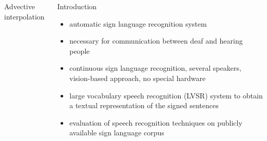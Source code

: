 \documentclass[final]{beamer}
\begin{document}
\begin{frame}{}
\begin{columns}[t]
\begin{column}{.3\linewidth}
\begin{block}{Advective interpolation}
      \end{block}
    \end{column}

  \begin{column}{.3\linewidth}
  \vfill
 
      \begin{block}{Introduction}
        \begin{itemize}
        \item automatic sign language recognition system                                    %
        \item \alert{necessary for communication} between deaf and
          hearing people
        \item \alert{continuous} sign language recognition,
          \alert{several} speakers, \alert{vision-based} approach, \alert{no
            special hardware}
        \item large vocabulary speech recognition (LVSR) system to
          obtain a textual representation of the signed
          sentences 
        \item evaluation of speech recognition techniques on \alert{publicly
          available sign language
          corpus}
        \end{itemize}
      \end{block}

    \end{column}

  \end{columns}


  \vfill
\end{frame}
\end{document}
